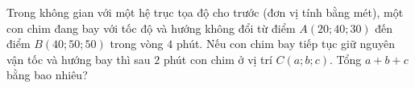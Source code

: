 \begin{ex}%
Trong không gian với một hệ trục tọa độ cho trước (đơn vị tính bằng mét), một con chim đang bay với tốc độ và hướng không đổi từ điểm $A(20;40;30)$ đến điểm $B(40;50;50)$ trong vòng $4$ phút. Nếu con chim bay tiếp tục giữ nguyên vận tốc và hướng bay thì sau $2$ phút con chim ở vị trí $C(a;b;c)$. Tổng $a+b+c$ bằng bao nhiêu?
\end{ex}

